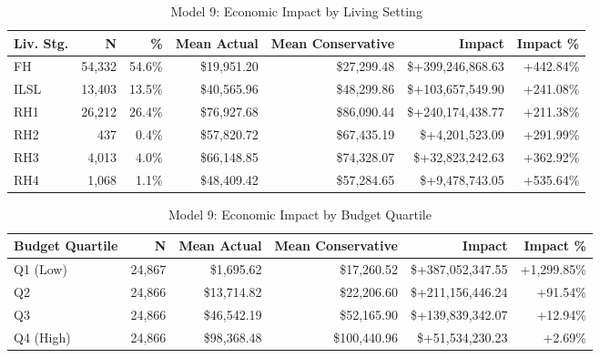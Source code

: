 \begin{table}[htbp]
\centering
\small
\caption{Model 9: Economic Impact by Living Setting}
\label{tab:model9_impact_living}
\begin{tabular}{lrrrrrr}
\toprule
\textbf{Liv. Stg.} & \textbf{N} & \textbf{\%} & \textbf{Mean Actual} & \textbf{Mean Conservative} & \textbf{Impact} & \textbf{Impact \%} \\
\midrule
FH & 54,332 & 54.6\% & \$19,951.20 & \$27,299.48 & \$+399,246,868.63 & +442.84\% \\
ILSL & 13,403 & 13.5\% & \$40,565.96 & \$48,299.86 & \$+103,657,549.90 & +241.08\% \\
RH1 & 26,212 & 26.4\% & \$76,927.68 & \$86,090.44 & \$+240,174,438.77 & +211.38\% \\
RH2 & 437 & 0.4\% & \$57,820.72 & \$67,435.19 & \$+4,201,523.09 & +291.99\% \\
RH3 & 4,013 & 4.0\% & \$66,148.85 & \$74,328.07 & \$+32,823,242.63 & +362.92\% \\
RH4 & 1,068 & 1.1\% & \$48,409.42 & \$57,284.65 & \$+9,478,743.05 & +535.64\% \\
\bottomrule
\end{tabular}
\end{table}

\begin{table}[htbp]
\centering
\small
\caption{Model 9: Economic Impact by Budget Quartile}
\label{tab:model9_impact_quartile}
\begin{tabular}{lrrrrr}
\toprule
\textbf{Budget Quartile} & \textbf{N} & \textbf{Mean Actual} & \textbf{Mean Conservative} & \textbf{Impact} & \textbf{Impact \%} \\
\midrule
Q1 (Low) & 24,867 & \$1,695.62 & \$17,260.52 & \$+387,052,347.55 & +1,299.85\% \\
Q2 & 24,866 & \$13,714.82 & \$22,206.60 & \$+211,156,446.24 & +91.54\% \\
Q3 & 24,866 & \$46,542.19 & \$52,165.90 & \$+139,839,342.07 & +12.94\% \\
Q4 (High) & 24,866 & \$98,368.48 & \$100,440.96 & \$+51,534,230.23 & +2.69\% \\
\bottomrule
\end{tabular}
\end{table}

